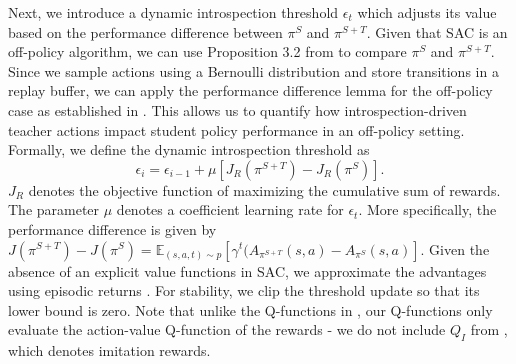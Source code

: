 \documentclass{article} %
\begin{document}
Next, we introduce a dynamic introspection threshold $\epsilon_t$ which adjusts its value based on the performance difference between $\pi^S$ and $\pi^{S+T}$. Given that SAC is an off-policy algorithm, we can use Proposition 3.2 from \cite{shenfeld2023tgrl} to compare $\pi^S$ and $\pi^{S+T}$. Since we sample actions using a Bernoulli distribution and store transitions in a replay buffer, we can apply the performance difference lemma for the off-policy case as established in \citet{schulman2015trust, shenfeld2023tgrl,kakade_approximately_2002}. This allows us to quantify how introspection-driven teacher actions impact student policy performance in an off-policy setting. Formally, we define the dynamic introspection threshold as
\begin{equation}
    \epsilon_i = \epsilon_{i-1} + \mu[J_R(\pi^{S+T})-J_R(\pi^{S})].
\end{equation}          
$J_R$ denotes the objective function of maximizing the cumulative sum of rewards. The parameter $\mu$ denotes a coefficient learning rate for $\epsilon_t$. More specifically, the performance difference is given by $J(\pi^{S+T})-J(\pi^{S}) =  \mathbb{E}_{(s,a,t)\sim p}[\gamma^t(A_{\pi^{S+T}}(s,a) - A_{\pi^{S}}(s,a)]$. Given the absence of an explicit value functions in SAC, we approximate the advantages using episodic returns \citep{fujimoto2018addressing}. For stability, we clip the threshold update so that its lower bound is zero. Note that unlike the Q-functions in \cite{shenfeld2023tgrl}, our Q-functions only evaluate the action-value Q-function of the rewards - we do not include $Q_I$ from \cite{shenfeld2023tgrl}, which denotes imitation rewards. 

\end{document}
